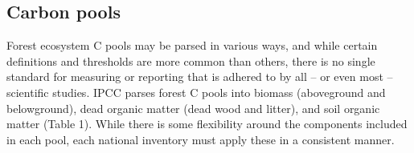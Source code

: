 \documentclass[, manuscript]{copernicus}
\begin{document}
\subsection{Carbon pools}

Forest ecosystem C pools may be parsed in various ways, and while
certain definitions and thresholds are more common than others, there is
no single standard for measuring or reporting that is adhered to by all
-- or even most -- scientific studies. IPCC parses forest C pools into
biomass (aboveground and belowground), dead organic matter (dead wood
and litter), and soil organic matter (Table 1). While there is some
flexibility around the components included in each pool, each national
inventory must apply these in a consistent manner.

\begin{table}


\end{table}
\end{document}
